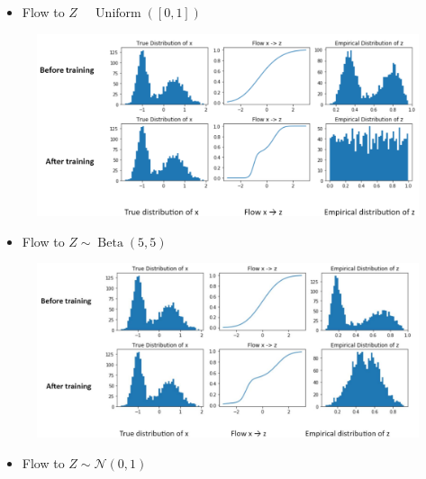 \documentclass{report}
\begin{document}
\begin{example}
    \begin{itemize}
        \item Flow to $Z$ ~ $\operatorname{Uniform}([0,1])$
    \end{itemize}

    \begin{figure}[H]
        \centering
        \includegraphics[width=1.0\textwidth]{.././assets/10.8.png}
    \end{figure}

    \begin{itemize}
        \item Flow to $Z \sim \operatorname{Beta}(5,5)$
    \end{itemize}

    \begin{figure}[H]
        \centering
        \includegraphics[width=1.0\textwidth]{.././assets/10.9.png}
    \end{figure}

    \begin{itemize}
        \item Flow to $Z \sim \mathcal{N}(0,1)$
    \end{itemize}


\end{example}
\end{document}

